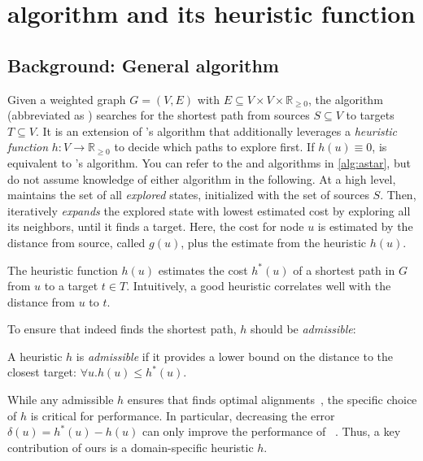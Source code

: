 \section{\A algorithm and its heuristic function} \label{sec:astar}

\subsection{Background: General \A algorithm} \label{TRIEsubsec:general-astar}
Given a weighted graph $G=(V,E)$ with $E \subseteq V \times V \times
\mathbb{R}_{\geq 0}$, the \A algorithm (abbreviated as \A) searches for the
shortest path from sources $S \subseteq V$ to targets $T \subseteq V$. It is an
extension of \dijkstra's algorithm that additionally leverages a \emph{heuristic
function} $h \colon V \to \mathbb{R}_{\geq 0}$ to decide which paths to explore
first.
%
If $h(u) \equiv 0$, \A is equivalent to \dijkstra's algorithm.
%
You can refer to the \A and \dijkstra algorithms in \cref{alg:astar}, but do not
assume knowledge of either algorithm in the following.
%
At a high level, \A maintains the set of all \emph{explored} states, initialized
with the set of sources $S$. Then, \A iteratively \emph{expands} the explored
state with lowest estimated cost by exploring all its neighbors, until it finds
a target. Here, the cost for node $u$ is estimated by the distance from source, called $g(u)$, plus the estimate from the heuristic $h(u)$.

The heuristic function $h(u)$ estimates the
cost $h^*(u)$ of a shortest path in $G$ from $u$ to a target $t \in T$. Intuitively, a
good heuristic correlates well with the distance from $u$ to $t$.

To ensure that \A indeed finds the shortest path, $h$ should be
\emph{admissible}:

\begin{definition} A heuristic $h$ is \emph{admissible}
    if it provides a lower bound on the distance to the closest target: $\forall
    u. h(u) \leq h^*(u)$.
\end{definition}

While any admissible $h$ ensures that \A finds optimal
alignments~\cite{dechter_generalized_1985}, the specific choice of $h$
is critical for performance. In particular, decreasing the error $\delta(u) =
h^*(u)-h(u)$ can only improve the performance of
\A~\cite{dechter_generalized_1985}. Thus, a key contribution of ours is
a domain-specific heuristic $h$.


